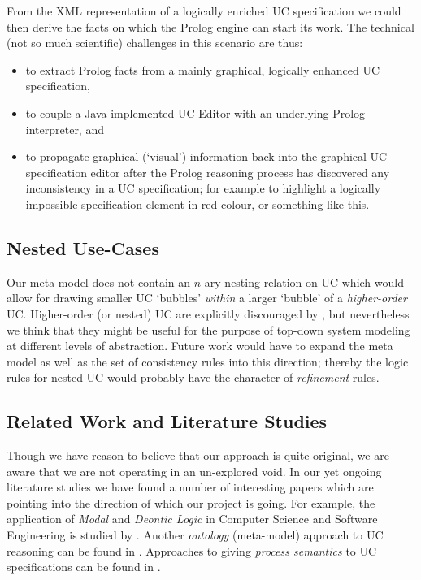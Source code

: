 From the XML representation of a logically enriched UC specification 
we could then derive the facts on which the {\sc Prolog} engine can 
start its work. The technical (not so much scientific) challenges in 
this scenario are thus:
\begin{itemize}
\item	to extract {\sc Prolog} facts from a mainly graphical, logically
 enhanced UC specification,
\item to couple a {\sc Java}-implemented UC-Editor with an underlying 
 {\sc Prolog} interpreter, and
\item to propagate graphical (`visual') information back into the 
 graphical UC specification editor after the {\sc Prolog} reasoning 
 process has discovered any inconsistency in a UC specification; for 
 example to highlight a logically impossible specification element 
 in red colour, or something like this.
\end{itemize}

\subsection{Nested Use-Cases}

Our meta model does not contain an $n$-ary nesting relation on UC which 
would allow for drawing smaller UC `bubbles' \emph{within} a larger `bubble' 
of a \emph{higher-order} UC. Higher-order (or nested) UC are explicitly 
discouraged by \cite{KGu04}, but nevertheless we think that they might 
be useful for the purpose of top-down system modeling at different levels
of abstraction. Future work would have to expand the meta model as well as 
the set of consistency rules into this direction; thereby the logic rules 
for nested UC would probably have the character of \emph{refinement} rules.

\subsection{Related Work and Literature Studies}

Though we have reason to believe that our approach is quite original, 
we are aware that we are not operating in an un-explored void. In our 
yet ongoing literature studies we have found a number of interesting 
papers which are pointing into the direction of which our project is 
going. For example, the application of \emph{Modal} and \emph{Deontic 
Logic} in Computer Science and Software Engineering is studied by 
\cite{Den} \cite{Kola} \cite{Mai} \cite{Seger}. Another \emph{ontology} (meta-model) approach to UC reasoning can be found in \cite{Gen}. 
Approaches to giving \emph{process semantics} to UC specifications 
can be found in \cite{Back} \cite{Kot} \cite{Li}. 

